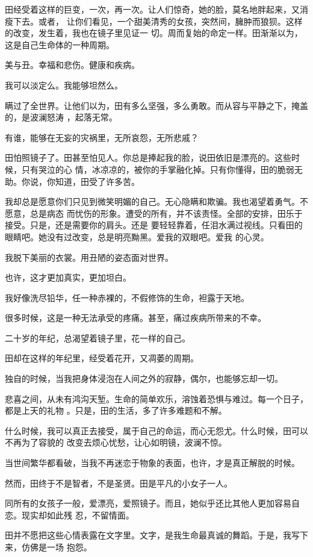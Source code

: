 \documentclass[12pt,a4paper]{article}
\begin{document}
		田经受着这样的巨变，一次，再一次。让人们惊奇，她的脸，莫名地胖起来，又消瘦下去。或者，
	让你们看见，一个甜美清秀的女孩，突然间，臃肿而狼狈。这样的改变，发生着，我也在镜子里见证一
	切。周而复始的命定一样。田渐渐以为，这是自己生命体的一种周期。

		美与丑。幸福和悲伤。健康和疾病。

		我可以淡定么。我能够坦然么。

		瞒过了全世界。让他们以为，田有多么坚强，多么勇敢。而从容与平静之下，掩盖的，是波澜怒涛
	，起落无常。

		有谁，能够在无妄的灾祸里，无所哀怨，无所悲戚？

		田怕照镜子了。田甚至怕见人。你总是捧起我的脸，说田依旧是漂亮的。这些时候，只有哭泣的心
	情，冰凉凉的，被你的手掌融化掉。只有你懂得，田的脆弱无助。你说，你知道，田受了许多苦。

		我却总是愿意你们只见到微笑明媚的自己。无心隐瞒和欺骗。我也渴望着勇气。不愿意，总是病态
	而忧伤的形象。遭受的所有，并不该责怪。全部的安排，田乐于接受。只是，还是需要你的肩头。还是
	要轻轻靠着，任泪水满过视线。只看田的眼睛吧。她没有过改变，总是明亮黝黑。爱我的双眼吧。爱我
	的心灵。

		我脱下美丽的衣裳。用丑陋的姿态面对世界。

		也许，这才更加真实，更加坦白。

		我好像洗尽铅华，任一种赤裸的，不假修饰的生命，袒露于天地。

		很多时候，这是一种无法承受的疼痛。甚至，痛过疾病所带来的不幸。

		二十岁的年纪，总渴望着镜子里，花一样的自己。

		田却在这样的年纪里，经受着花开，又凋萎的周期。

		独自的时候，当我把身体浸泡在人间之外的寂静，偶尔，也能够忘却一切。

		悲喜之间，从未有鸿沟天堑。生命的简单欢乐，溶蚀着恐惧与难过。每一个日子，都是上天的礼物
	。只是，田的生活，多了许多难题和不解。

		什么时候，我可以真正去接受，属于自己的命运，而心无怨尤。什么时候，田可以不再为了容貌的
	改变去烦心忧愁，让心如明镜，波澜不惊。

		当世间繁华都看破，当我不再迷恋于物象的表面，也许，才是真正解脱的时候。

		然而，田终于不是智者，不是圣贤。田是平凡的小女子一人。

		同所有的女孩子一般，爱漂亮，爱照镜子。而且，她似乎还比其他人更加容易自恋。现实却如此残
	忍，不留情面。

		田并不愿把这些心情表露在文字里。文字，是我生命最真诚的舞蹈。于是，我写下来，仿佛是一场
	抱怨。
\end{document}
